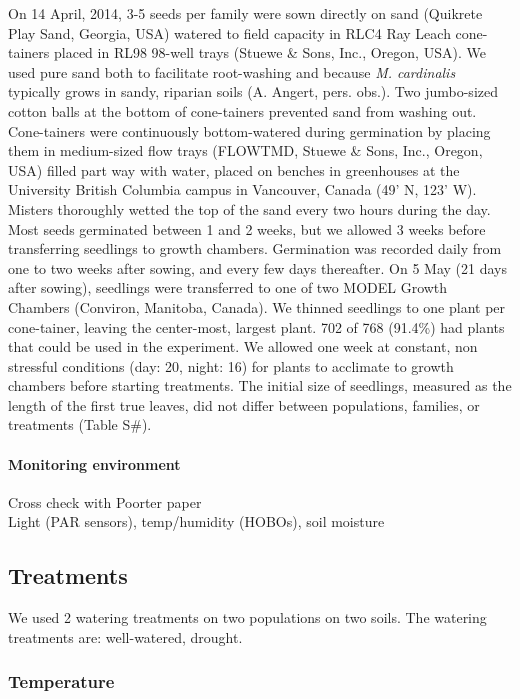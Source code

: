 \documentclass[11pt, oneside]{article}\usepackage[]{graphicx}\usepackage[]{color}
\begin{document}
On 14 April, 2014, 3-5 seeds per family were sown directly on sand (Quikrete Play Sand, Georgia, USA) watered to field capacity in RLC4 Ray Leach cone-tainers placed in RL98 98-well trays (Stuewe \& Sons, Inc., Oregon, USA). We used pure sand both to facilitate root-washing and because \textit{M. cardinalis} typically grows in sandy, riparian soils (A. Angert, pers. obs.). Two jumbo-sized cotton balls at the bottom of cone-tainers prevented sand from washing out. Cone-tainers were continuously bottom-watered during germination by placing them in medium-sized flow trays (FLOWTMD, Stuewe \& Sons, Inc., Oregon, USA) filled part way with water, placed on benches in greenhouses at the University British Columbia campus in Vancouver, Canada (49' N, 123' W). Misters thoroughly wetted the top of the sand every two hours during the day. Most seeds germinated between 1 and 2 weeks, but we allowed 3 weeks before transferring seedlings to growth chambers. Germination was recorded daily from one to two weeks after sowing, and every few days thereafter. On 5 May (21 days after sowing), seedlings were transferred to one of two MODEL Growth Chambers (Conviron, Manitoba, Canada). We thinned seedlings to one plant per cone-tainer, leaving the center-most, largest plant. 702 of 768 (91.4\%) had plants that could be used in the experiment. We allowed one week at constant, non stressful conditions (day: 20\celsius, night: 16\celsius) for plants to acclimate to growth chambers before starting treatments. The initial size of seedlings, measured as the length of the first true leaves, did not differ between populations, families, or treatments (Table S\#).

\paragraph*{Monitoring environment}

  	Cross check with Poorter paper \\
		Light (PAR sensors), temp/humidity (HOBOs), soil moisture
    
\subsection*{Treatments}

We used 2 watering treatments on two populations on two soils. The watering treatments are: well-watered, drought.

\subsubsection*{Temperature}
\end{document}
